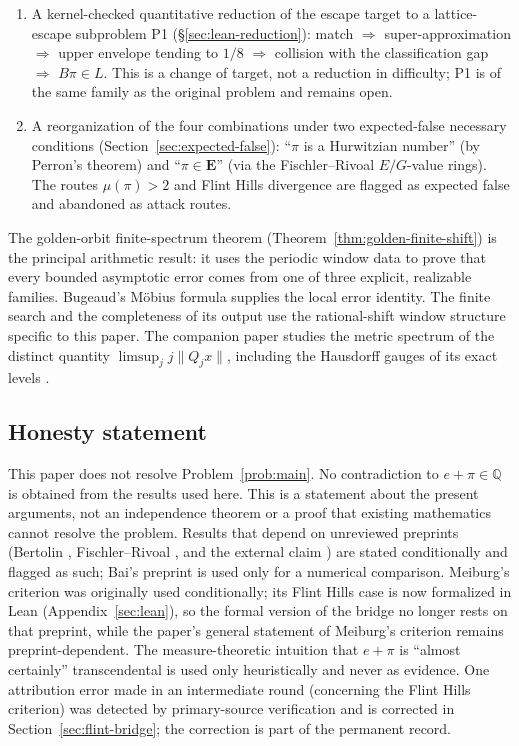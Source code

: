 \documentclass[11pt]{amsart}
\theoremstyle{definition}
\theoremstyle{remark}
\numberwithin{equation}{section}
\newcommand{\Q}{\mathbb{Q}}
\newcommand{\irr}{\mu}
\begin{document}
\begin{enumerate}
\item A kernel-checked quantitative reduction of the escape target to a lattice-escape subproblem P1 (\S\ref{sec:lean-reduction}): match $\Rightarrow$ super-approximation $\Rightarrow$ upper envelope tending to $1/8$ $\Rightarrow$ collision with the classification gap $\Rightarrow$ $B\pi\in L$. This is a change of target, not a reduction in difficulty; P1 is of the same family as the original problem and remains open.
\item A reorganization of the four combinations under two expected-false necessary conditions (Section~\ref{sec:expected-false}): ``$\pi$ is a Hurwitzian number'' (by Perron's theorem) and ``$\pi\in\mathbf{E}$'' (via the Fischler--Rivoal $E/G$-value rings). The routes $\irr(\pi)>2$ and Flint Hills divergence are flagged as expected false and abandoned as attack routes.
\end{enumerate}

The golden-orbit finite-spectrum theorem
(Theorem~\ref{thm:golden-finite-shift}) is the principal arithmetic
result: it uses the periodic window data to prove that every bounded
asymptotic error comes from one of three explicit, realizable families.
Bugeaud's M\"obius formula
\cite[eq.~(3.4)]{BugeaudQuad} supplies the local error identity. The finite
search and the completeness of its output use the rational-shift window
structure specific to this paper. The companion paper studies the metric
spectrum of the distinct quantity $\limsup_j j\|Q_jx\|$, including the
Hausdorff gauges of its exact levels \cite{CompanionGauge}.

\subsection{Honesty statement} This paper does not resolve Problem~\ref{prob:main}. No contradiction to $e+\pi\in\Q$ is obtained from the results used here. This is a statement about the present arguments, not an independence theorem or a proof that existing mathematics cannot resolve the problem. Results that depend on unreviewed preprints (Bertolin \cite{Bertolin2026}, Fischler--Rivoal \cite{FischlerRivoal2026}, and the external claim \cite{OpenAI2026}) are stated conditionally and flagged as such; Bai's preprint \cite{Bai2026} is used only for a numerical comparison. Meiburg's criterion \cite{Meiburg2022} was originally used conditionally; its Flint Hills case is now formalized in Lean (Appendix~\ref{sec:lean}), so the formal version of the bridge no longer rests on that preprint, while the paper's general statement of Meiburg's criterion remains preprint-dependent. The measure-theoretic intuition that $e+\pi$ is ``almost certainly'' transcendental is used only heuristically and never as evidence. One attribution error made in an intermediate round (concerning the Flint Hills criterion) was detected by primary-source verification and is corrected in Section~\ref{sec:flint-bridge}; the correction is part of the permanent record.
\end{document}

